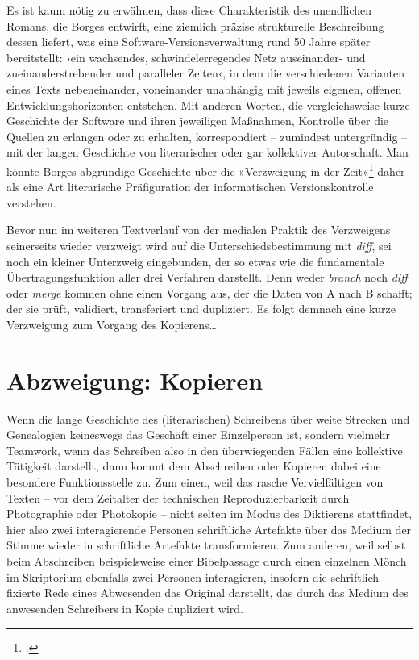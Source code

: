 \documentclass[a4paper,11pt]{article}
\newcommand{\anf}[1]{»#1«}
\newcommand{\inanf}[1]{›#1‹}
\begin{document}
Es ist kaum nötig zu erwähnen, dass diese Charakteristik des unendlichen Romans, die Borges entwirft, eine ziemlich präzise strukturelle Beschreibung dessen liefert, was eine Software-Versionsverwaltung rund 50 Jahre später bereitstellt: \inanf{ein wachsendes, schwindelerregendes Netz auseinander- und zueinanderstrebender und paralleler Zeiten}, in dem die verschiedenen Varianten eines Texts nebeneinander, voneinander unabhängig mit jeweils eigenen, offenen Entwicklungshorizonten entstehen. Mit anderen Worten, die vergleichsweise kurze Geschichte der Software und ihren jeweiligen Maßnahmen, Kontrolle über die Quellen zu erlangen oder zu erhalten, korrespondiert – zumindest untergründig – mit der langen Geschichte von literarischer oder gar kollektiver Autorschaft. Man könnte Borges abgründige Geschichte über die \anf{Verzweigung in der Zeit}\footcite[169]{borges:1941} daher als eine Art literarische Präfiguration der informatischen Versionskontrolle verstehen. 

Bevor nun im weiteren Textverlauf von der medialen Praktik des Verzweigens seinerseits wieder verzweigt wird auf die Unterschiedsbestimmung mit \emph{diff}, sei noch ein kleiner Unterzweig eingebunden, der so etwas wie die fundamentale Übertragungsfunktion aller drei Verfahren darstellt. Denn weder \emph{branch} noch \emph{diff} oder \emph{merge} kommen ohne einen Vorgang aus, der die Daten von A nach B schafft; der sie prüft, validiert, transferiert und dupliziert. Es folgt demnach eine kurze Verzweigung zum Vorgang des Kopierens\ldots


\section*{Abzweigung: Kopieren}

Wenn die lange Geschichte des (literarischen) Schreibens über weite Strecken und Genealogien keineswegs das Geschäft einer Einzelperson ist, sondern vielmehr Teamwork, wenn das Schreiben also in den überwiegenden Fällen eine kollektive Tätigkeit darstellt, dann kommt dem Abschreiben oder Kopieren dabei eine besondere Funktionsstelle zu. Zum einen, weil das rasche Vervielfältigen von Texten – vor dem Zeitalter der technischen Reproduzierbarkeit durch Photographie oder Photokopie – nicht selten im Modus des Diktierens stattfindet, hier also zwei interagierende Personen schriftliche Artefakte über das Medium der Stimme wieder in schriftliche Artefakte transformieren. Zum anderen, weil selbst beim Abschreiben beispielsweise einer Bibelpassage durch einen einzelnen Mönch im Skriptorium ebenfalls zwei Personen interagieren, insofern die schriftlich fixierte Rede eines Abwesenden das Original darstellt, das durch das Medium des anwesenden Schreibers in Kopie dupliziert wird. 
\end{document}
